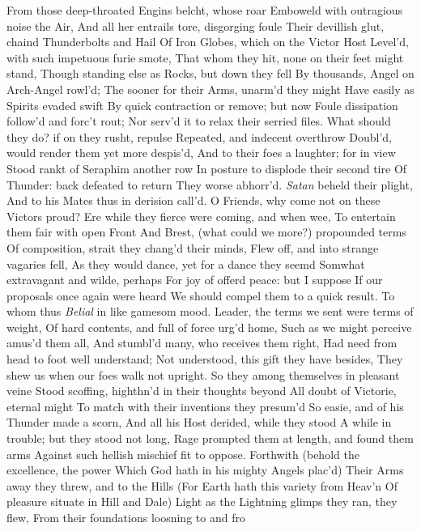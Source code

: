 \documentclass[11pt]{book}
\begin{document}
From those deep-throated Engins belcht, whose roar 
Emboweld with outragious noise the Air, 
And all her entrails tore, disgorging foule 
Their devillish glut, chaind Thunderbolts and Hail 
Of Iron Globes, which on the Victor Host 
Level'd, with such impetuous furie smote, 
That whom they hit, none on their feet might stand, 
Though standing else as Rocks, but down they fell 
By thousands, Angel on Arch-Angel rowl'd; 
The sooner for their Arms, unarm'd they might 
Have easily as Spirits evaded swift 
By quick contraction or remove; but now 
Foule dissipation follow'd and forc't rout; 
Nor serv'd it to relax their serried files. 
What should they do? if on they rusht, repulse 
Repeated, and indecent overthrow 
Doubl'd, would render them yet more despis'd, 
And to their foes a laughter; for in view 
Stood rankt of Seraphim another row 
In posture to displode their second tire 
Of Thunder: back defeated to return 
They worse abhorr'd.  \textit{Satan} beheld their plight, 
And to his Mates thus in derision call'd. 
\quad O Friends, why come not on these Victors proud? 
Ere while they fierce were coming, and when wee, 
To entertain them fair with open Front 
And Brest, (what could we more?) propounded terms 
Of composition, strait they chang'd their minds, 
Flew off, and into strange vagaries fell, 
As they would dance, yet for a dance they seemd 
Somwhat extravagant and wilde, perhaps 
For joy of offerd peace: but I suppose 
If our proposals once again were heard 
We should compel them to a quick result. 
\quad To whom thus \textit{Belial} in like gamesom mood. 
Leader, the terms we sent were terms of weight, 
Of hard contents, and full of force urg'd home, 
Such as we might perceive amus'd them all, 
And stumbl'd many, who receives them right, 
Had need from head to foot well understand; 
Not understood, this gift they have besides, 
They shew us when our foes walk not upright. 
\quad So they among themselves in pleasant veine 
Stood scoffing, highthn'd in their thoughts beyond 
All doubt of Victorie, eternal might 
To match with their inventions they presum'd 
So easie, and of his Thunder made a scorn, 
And all his Host derided, while they stood 
A while in trouble; but they stood not long, 
Rage prompted them at length, and found them arms 
Against such hellish mischief fit to oppose. 
Forthwith (behold the excellence, the power 
Which God hath in his mighty Angels plac'd) 
Their Arms away they threw, and to the Hills 
(For Earth hath this variety from Heav'n 
Of pleasure situate in Hill and Dale) 
Light as the Lightning glimps they ran, they flew, 
From their foundations loosning to and fro 
\end{document}
